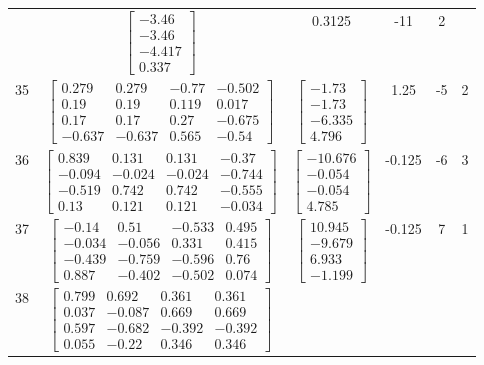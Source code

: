 \documentclass[a4paper,12pt]{article}
\begin{document}
\begin{tabular}{c c c c c c}
&
$\begin{bmatrix} -3.46 \\ -3.46 \\ -4.417 \\ 0.337 \end{bmatrix}$
&
0.3125
&
-11
&
2
\\
35
&
$\begin{bmatrix} 0.279 & 0.279 & -0.77 & -0.502 \\ 0.19 & 0.19 & 0.119 & 0.017 \\ 0.17 & 0.17 & 0.27 & -0.675 \\ -0.637 & -0.637 & 0.565 & -0.54 \end{bmatrix}$
&
$\begin{bmatrix} -1.73 \\ -1.73 \\ -6.335 \\ 4.796 \end{bmatrix}$
&
1.25
&
-5
&
2
\\
36
&
$\begin{bmatrix} 0.839 & 0.131 & 0.131 & -0.37 \\ -0.094 & -0.024 & -0.024 & -0.744 \\ -0.519 & 0.742 & 0.742 & -0.555 \\ 0.13 & 0.121 & 0.121 & -0.034 \end{bmatrix}$
&
$\begin{bmatrix} -10.676 \\ -0.054 \\ -0.054 \\ 4.785 \end{bmatrix}$
&
-0.125
&
-6
&
3
\\
37
&
$\begin{bmatrix} -0.14 & 0.51 & -0.533 & 0.495 \\ -0.034 & -0.056 & 0.331 & 0.415 \\ -0.439 & -0.759 & -0.596 & 0.76 \\ 0.887 & -0.402 & -0.502 & 0.074 \end{bmatrix}$
&
$\begin{bmatrix} 10.945 \\ -9.679 \\ 6.933 \\ -1.199 \end{bmatrix}$
&
-0.125
&
7
&
1
\\
38
&
$\begin{bmatrix} 0.799 & 0.692 & 0.361 & 0.361 \\ 0.037 & -0.087 & 0.669 & 0.669 \\ 0.597 & -0.682 & -0.392 & -0.392 \\ 0.055 & -0.22 & 0.346 & 0.346 \end{bmatrix}$

\end{tabular}
\end{document}
